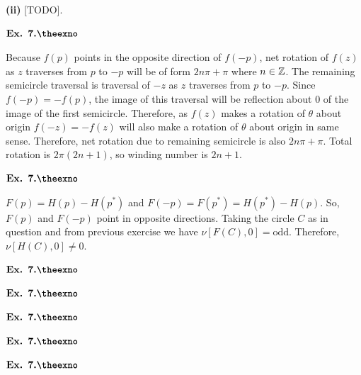 \documentclass{article}
\def\tf{\textbf}
\def\mb{\ensuremath\mathbb}
\def\Z{\ensuremath\mb{Z}}
\newcounter{exno}
\begin{document}
\tf{(ii)} [TODO].

\vspace{0.2in}

${\textbf{Ex. 7.\theexno}}$
\addtocounter{exno}{1}

Because $f(p)$ points in the opposite direction of $f(-p)$, net rotation of $f(z)$ as $z$ traverses from $p$ to $-p$ will be of form $2n\pi + \pi$ where $n\in\Z$. The remaining semicircle traversal is traversal of $-z$ as $z$ traverses from $p$ to $-p$. Since $f(-p)=-f(p)$, the image of this traversal will be reflection about $0$ of the image of the first semicircle. Therefore, as $f(z)$ makes a rotation of $\theta$ about origin $f(-z)=-f(z)$ will also make a rotation of $\theta$ about origin in same sense. Therefore, net rotation due to remaining semicircle is also $2n\pi+\pi$. Total rotation is $2\pi(2n+1)$, so winding number is $2n+1$.

\vspace{0.2in}

${\textbf{Ex. 7.\theexno}}$
\addtocounter{exno}{1}

$F(p) = H(p)-H(p^*)$ and $F(-p) = F(p^*) = H(p^*) - H(p)$. So, $F(p)$ and $F(-p)$ point in opposite directions. Taking the circle $C$ as in question and from previous exercise we have $\nu[F(C),0]=\text{odd}$. Therefore, $\nu[H(C),0]\neq 0$.

\vspace{0.2in}

${\textbf{Ex. 7.\theexno}}$
\addtocounter{exno}{1}



\vspace{0.2in}

${\textbf{Ex. 7.\theexno}}$
\addtocounter{exno}{1}

\vspace{0.2in}

${\textbf{Ex. 7.\theexno}}$
\addtocounter{exno}{1}

\vspace{0.2in}

${\textbf{Ex. 7.\theexno}}$
\addtocounter{exno}{1}

\vspace{0.2in}

${\textbf{Ex. 7.\theexno}}$
\addtocounter{exno}{1}
\end{document}

